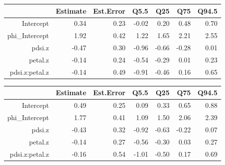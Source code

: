 \documentclass{article}[11pt]
\begin{document}
\begin{table}[ht]
\centering
\begin{tabular}{rrrrrrr}
  \hline
 & Estimate & Est.Error & Q5.5 & Q25 & Q75 & Q94.5 \\ 
  \hline
Intercept & 0.34 & 0.23 & -0.02 & 0.20 & 0.48 & 0.70 \\ 
  phi\_Intercept & 1.92 & 0.42 & 1.22 & 1.65 & 2.21 & 2.55 \\ 
  pdsi.z & -0.47 & 0.30 & -0.96 & -0.66 & -0.28 & 0.01 \\ 
  petal.z & -0.14 & 0.24 & -0.54 & -0.29 & 0.01 & 0.23 \\ 
  pdsi.z:petal.z & -0.14 & 0.49 & -0.91 & -0.46 & 0.16 & 0.65 \\ 
   \hline
\end{tabular}
\end{table}
\begin{table}[ht]
\centering
\begin{tabular}{rrrrrrr}
  \hline
 & Estimate & Est.Error & Q5.5 & Q25 & Q75 & Q94.5 \\ 
  \hline
Intercept & 0.49 & 0.25 & 0.09 & 0.33 & 0.65 & 0.88 \\ 
  phi\_Intercept & 1.77 & 0.41 & 1.09 & 1.50 & 2.06 & 2.39 \\ 
  pdsi.z & -0.43 & 0.32 & -0.92 & -0.63 & -0.22 & 0.07 \\ 
  petal.z & -0.14 & 0.27 & -0.56 & -0.30 & 0.03 & 0.27 \\ 
  pdsi.z:petal.z & -0.16 & 0.54 & -1.01 & -0.50 & 0.17 & 0.69 \\ 
   \hline
\end{tabular}
\end{table}
\pagebreak
\end{document}
